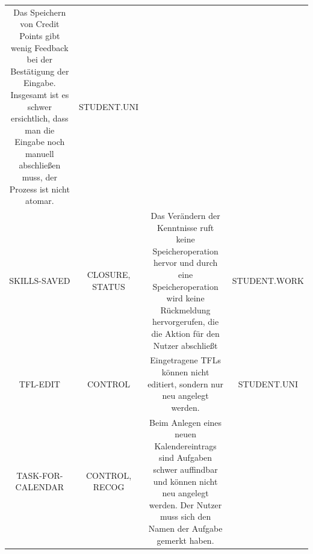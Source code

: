 \documentclass[
  12pt,
  ngerman,
  a4paper,
]{article}
\begin{document}
\begin{longtable}[]{@{}cccc@{}}
\begin{minipage}[t]{0.33\columnwidth}
Das Speichern von Credit Points gibt wenig Feedback bei der Bestätigung
der Eingabe. Insgesamt ist es schwer ersichtlich, dass man die Eingabe
noch manuell abschließen muss, der Prozess ist nicht atomar.\strut
\end{minipage} & \begin{minipage}[t]{0.32\columnwidth}\centering
STUDENT.UNI\strut
\end{minipage}\tabularnewline
\begin{minipage}[t]{0.11\columnwidth}\centering
SKILLS-SAVED\strut
\end{minipage} & \begin{minipage}[t]{0.13\columnwidth}\centering
CLOSURE, STATUS\strut
\end{minipage} & \begin{minipage}[t]{0.33\columnwidth}\centering
Das Verändern der Kenntnisse ruft keine Speicheroperation hervor und
durch eine Speicheroperation wird keine Rückmeldung hervorgerufen, die
die Aktion für den Nutzer abschließt\strut
\end{minipage} & \begin{minipage}[t]{0.32\columnwidth}\centering
STUDENT.WORK\strut
\end{minipage}\tabularnewline
\begin{minipage}[t]{0.11\columnwidth}\centering
TFL-EDIT\strut
\end{minipage} & \begin{minipage}[t]{0.13\columnwidth}\centering
CONTROL\strut
\end{minipage} & \begin{minipage}[t]{0.33\columnwidth}\centering
Eingetragene TFLs können nicht editiert, sondern nur neu angelegt
werden.\strut
\end{minipage} & \begin{minipage}[t]{0.32\columnwidth}\centering
STUDENT.UNI\strut
\end{minipage}\tabularnewline
\begin{minipage}[t]{0.11\columnwidth}\centering
TASK-FOR-CALENDAR\strut
\end{minipage} & \begin{minipage}[t]{0.13\columnwidth}\centering
CONTROL, RECOG\strut
\end{minipage} & \begin{minipage}[t]{0.33\columnwidth}\centering
Beim Anlegen eines neuen Kalendereintrags sind Aufgaben schwer
auffindbar und können nicht neu angelegt werden. Der Nutzer muss sich
den Namen der Aufgabe gemerkt haben.\strut
\end{minipage} & \begin{minipage}[t]{0.32\columnwidth}\centering

\end{minipage}
\end{longtable}
\end{document}
